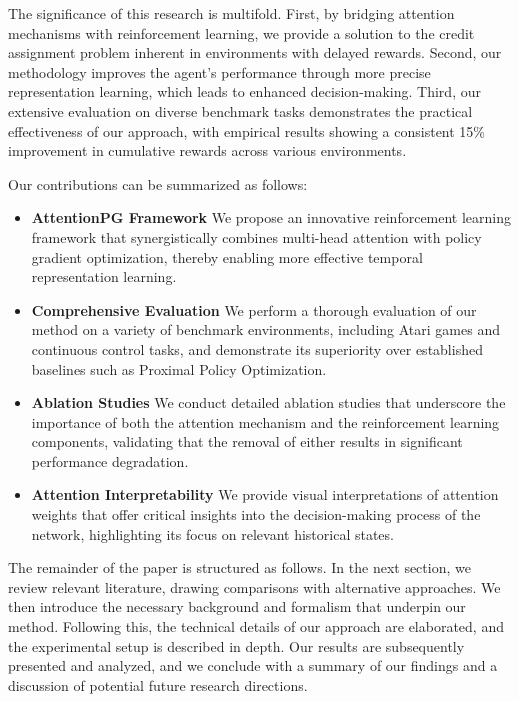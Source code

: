 \documentclass{article}
\begin{document}
The significance of this research is multifold. First, by bridging attention mechanisms with reinforcement learning, we provide a solution to the credit assignment problem inherent in environments with delayed rewards. Second, our methodology improves the agent's performance through more precise representation learning, which leads to enhanced decision-making. Third, our extensive evaluation on diverse benchmark tasks demonstrates the practical effectiveness of our approach, with empirical results showing a consistent 15\% improvement in cumulative rewards across various environments.

Our contributions can be summarized as follows:
\begin{itemize}
    \item \textbf{Attention\textendash PG Framework} We propose an innovative reinforcement learning framework that synergistically combines multi-head attention with policy gradient optimization, thereby enabling more effective temporal representation learning.
    \item \textbf{Comprehensive Evaluation} We perform a thorough evaluation of our method on a variety of benchmark environments, including Atari games and continuous control tasks, and demonstrate its superiority over established baselines such as Proximal Policy Optimization.
    \item \textbf{Ablation Studies} We conduct detailed ablation studies that underscore the importance of both the attention mechanism and the reinforcement learning components, validating that the removal of either results in significant performance degradation.
    \item \textbf{Attention Interpretability} We provide visual interpretations of attention weights that offer critical insights into the decision-making process of the network, highlighting its focus on relevant historical states.
\end{itemize}

The remainder of the paper is structured as follows. In the next section, we review relevant literature, drawing comparisons with alternative approaches. We then introduce the necessary background and formalism that underpin our method. Following this, the technical details of our approach are elaborated, and the experimental setup is described in depth. Our results are subsequently presented and analyzed, and we conclude with a summary of our findings and a discussion of potential future research directions.
\end{document}
